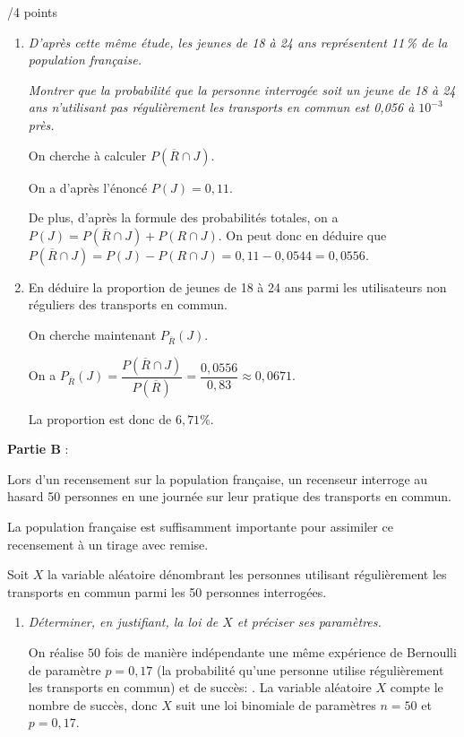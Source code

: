 \documentclass[a4paper]{article}
\begin{document}
\begin{exerciceinterro}{\hspace{2cm}/4 points}{}
\begin{enumerate}
\item \textit{D'après cette même étude, les jeunes de 18 à 24 ans représentent 11\,\% de la population française.}

\textit{Montrer que la probabilité que la personne interrogée soit un jeune de 18 à 24 ans n'utilisant pas régulièrement les transports en commun est 0,056 à $10^{-3}$ près.}

On cherche à calculer $P(\overline{R} \cap J)$.

On a d'après l'énoncé $P(J)=0,11$. 

De plus, d'après la formule des probabilités totales, on a $P(J)=P(\overline{R} \cap J)+P(R \cap J)$. On peut donc en déduire que $P(\overline{R} \cap J)=P(J)-P(R \cap J)=0,11-0,0544=0,0556$.

\item En déduire la proportion de jeunes de 18 à 24 ans parmi les utilisateurs non réguliers des transports en commun.

On cherche maintenant $P_{\overline{R}}(J)$.

On a $P_{\overline{R}}(J)=\dfrac{P(\overline{R} \cap J)}{P(\overline{R})}=\dfrac{0,0556}{0,83}\approx 0,0671$.

La proportion est donc de $6,71\%$.
\end{enumerate}

\bigskip

\textbf{Partie B} :

\medskip

Lors d'un recensement sur la population française, un recenseur interroge au hasard 50 personnes en une journée sur leur pratique des transports en commun. 

La population française est suffisamment importante pour assimiler ce recensement à un tirage avec remise.

Soit $X$ la variable aléatoire dénombrant les personnes utilisant régulièrement les transports en commun parmi les 50 personnes interrogées.

\medskip

\begin{enumerate}
\item \textit{Déterminer, en justifiant, la loi de $X$ et préciser ses paramètres.}

On réalise $50$ fois de manière indépendante une même expérience de Bernoulli de paramètre $p=0,17$ (la probabilité qu'une personne utilise régulièrement les transports en commun) et de succès: . La variable aléatoire $X$ compte le nombre de succès, donc $X$ suit une loi binomiale de paramètres $n=50$ et $p=0,17$.


\end{enumerate}
\end{exerciceinterro}
\end{document}
